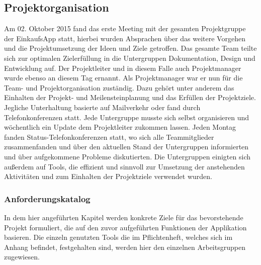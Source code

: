 \documentclass[12pt,a4paper]{article}
\begin{document}
\subsection{Projektorganisation}
Am 02. Oktober 2015 fand das erste Meeting mit der gesamten Projektgruppe der EinkaufsApp statt, hierbei wurden Absprachen über das weitere Vorgehen und die Projektumsetzung der Ideen und Ziele getroffen.
Das gesamte Team teilte sich zur optimalen Zielerfüllung in die Untergruppen Dokumentation, Design und Entwicklung auf.
Der Projektleiter und in diesem Falle auch Projektmanager wurde ebenso an diesem Tag ernannt.
Als Projektmanager war er nun für die Team- und Projektorganisation zuständig. Dazu gehört unter anderem das Einhalten der Projekt- und Meilensteinplanung und das Erfüllen der Projektziele.
Jegliche Unterhaltung basierte auf Mailverkehr oder fand durch Telefonkonferenzen statt. Jede Untergruppe musste sich selbst organisieren und wöchentlich ein Update dem Projektleiter zukommen lassen. Jeden Montag fanden Status-Telefonkonferenzen statt, wo sich alle Teammitglieder zusammenfanden und über den aktuellen Stand der Untergruppen informierten und über aufgekommene Probleme diskutierten. 
Die Untergruppen einigten sich außerdem auf Tools, die effizient und sinnvoll zur Umsetzung der anstehenden Aktivitäten und zum Einhalten der Projektziele verwendet wurden. 

\subsubsection{Anforderungskatalog}
In dem hier angeführten Kapitel werden konkrete Ziele für das bevorstehende Projekt formuliert, die auf den zuvor aufgeführten Funktionen der Applikation basieren.
Die einzeln genutzten Tools die im Pflichtenheft, welches sich im Anhang befindet, festgehalten sind, werden hier den einzelnen Arbeitsgruppen zugewiesen.
\\
\end{document}
